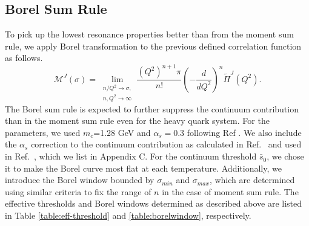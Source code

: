 \documentclass[aps,prc,superscriptaddress,showpacs,floatfix, nofootinbib,preprintnumbers,twocolumn]{revtex4}
\begin{document}
\subsection{Borel Sum Rule}
To pick up the lowest resonance properties better than from the  moment sum rule, we apply Borel transformation to the previous defined correlation function as follows.  
\begin{equation}
 \mathcal{M}^J(\sigma)  =\lim_{\substack{n/Q^2 \rightarrow \sigma, \\ n,Q^2
  \rightarrow \infty}}
  \frac{(Q^2)^{n+1}\pi}{n!}\left(-\frac{d}{dQ^2}\right)^n
  \tilde{\Pi}^J(Q^2).
\end{equation}
The Borel sum rule is expected to further suppress the continuum contribution than in the moment sum rule even for the heavy quark system\cite{Morita:2009qk}.
For the parameters, we used $m_c$=1.28 GeV and $\alpha_s=0.3$ following Ref \cite{Bertlmann:1981he}. We also include the $\alpha_s$ correction to the continuum contribution as calculated in Ref.~\cite{Reinders:1984sr} and used in Ref.~\cite{Morita:2009qk}, which we list in Appendix C. For the continuum threshold $\bar{s}_0$, we  chose it to make the Borel curve most flat at each temperature. Additionally,  we  introduce the Borel window bounded by $\sigma_{min}$ and $\sigma_{max}$, which are determined using similar criteria to fix the range of $n$ in the case of moment sum rule. The  effective thresholds and Borel windows determined as described above are listed in Table \ref{table:eff-threshold} and \ref{table:borelwindow}, respectively.
\end{document}
